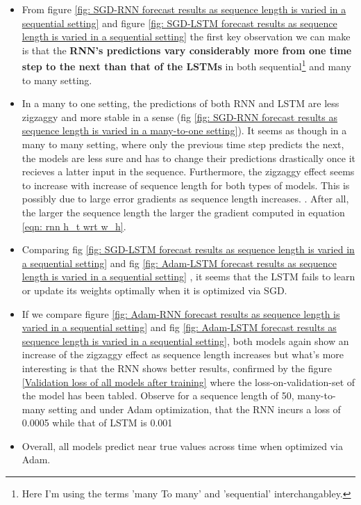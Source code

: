 \documentclass[12pt, letterpaper]{article}
\begin{document}
\begin{itemize}
    \item From figure \ref{fig: SGD-RNN forecast results as sequence length is varied in a sequential setting}
    and figure \ref{fig: SGD-LSTM forecast results as sequence length is varied in a sequential setting}
    the first key observation we can make is that the \textbf{RNN's predictions
    vary considerably more from one time step to the next than that of the 
    LSTMs} in both sequential\footnote{Here I'm using the terms 'many To
    many' and 'sequential' interchangabley.} and many to many setting. 

    \item In a many to one setting, the predictions of both RNN and LSTM are less zigzaggy and more stable in a sense (fig
    \ref{fig: SGD-RNN forecast results as sequence length is varied in a many-to-one setting}).
    It seems as though in a many to many setting, where only the previous
    time step predicts the next, the models are less sure and has to change their 
    predictions drastically once it recieves a latter input in the sequence. Furthermore,
    the zigzaggy effect seems to increase with increase of sequence length for both 
    types of models. This is possibly due to large error gradients as sequence length increases.
    . After all, the larger the sequence length the larger the gradient computed in equation \ref{eqn: rnn h_t wrt w_h}.
    
    \item Comparing fig \ref{fig: SGD-LSTM forecast results as sequence length is varied in a sequential setting}
    and fig \ref{fig: Adam-LSTM forecast results as sequence length is varied in a sequential setting}
    , it seems that the LSTM fails to learn or update its weights optimally
    when it is optimized via SGD.

    \item If we compare figure \ref{fig: Adam-RNN forecast results as sequence length is varied in a sequential setting} 
    and fig \ref{fig: Adam-LSTM forecast results as sequence length is varied in a sequential setting}, both models 
    again show an increase of the zigzaggy effect as sequence length increases but what's more interesting is 
    that the RNN shows better results, confirmed by the figure \ref{Validation loss of all models after training} 
    where the loss-on-validation-set of the model has been tabled. Observe for a sequence length of 50, many-to-many setting and under Adam optimization, 
    that the RNN incurs a loss of 0.0005 while that of LSTM is 0.001 
    
    \item Overall, all models predict near true values across time when optimized via Adam.
\end{itemize}
\end{document}
